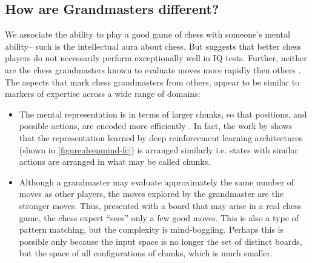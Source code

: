 \subsection{How are Grandmasters different?}
We associate the ability to play a good game of chess with someone's mental
ability-- such is the intellectual aura about chess. But 
\citet*{bilalic-mcleod-07_does-chess-need-intelligence_young-chess-players} 
suggests that better chess players do not necessarily perform exceptionally 
well in IQ tests. Further, neither are the chess grandmasters known to evaluate 
moves more rapidly then others \cite{de1996perception}. The aspects that mark 
chess grandmasters from others, appear to be similar to markers of expertise 
across a wide range of domains:
\begin{itemize}
 \item The mental representation is in terms of larger chunks, so that
	positions, and possible actions, are encoded more efficiently
	\cite{chase1973perception, gobet-clarkson-04memory_chunks}. In fact, 
the work by \citet*{deepmind_nips} shows that the representation learned by 
deep reinforcement learning architectures (shown in \ref{figure:deepmind-fc}) 
is arranged similarly i.e. states with similar actions are arranged in 
what may be called chunks.
\item Although a grandmaster may evaluate approximately the same number of
	moves as other players, the moves explored by the
	grandmaster are the stronger moves. Thus, presented with a board
	that may arise in a real chess game, the chess expert ``sees'' only a 
few good moves. This is also a type of pattern matching, but the 
complexity is mind-boggling. Perhaps this is possible 
only because the input space is no longer the set of distinct boards, but the 
space of all configurations of chunks, which is much smaller.
\end{itemize}



